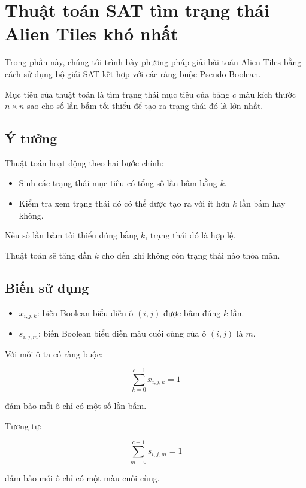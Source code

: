 \section{Thuật toán SAT tìm trạng thái Alien Tiles khó nhất}

Trong phần này, chúng tôi trình bày phương pháp giải bài toán
Alien Tiles bằng cách sử dụng bộ giải SAT kết hợp với các ràng buộc
Pseudo-Boolean.

Mục tiêu của thuật toán là tìm trạng thái mục tiêu của bảng
$c$ màu kích thước $n \times n$ sao cho số lần bấm tối thiểu
để tạo ra trạng thái đó là lớn nhất.

\subsection{Ý tưởng}

Thuật toán hoạt động theo hai bước chính:

\begin{itemize}
\item Sinh các trạng thái mục tiêu có tổng số lần bấm bằng $k$.
\item Kiểm tra xem trạng thái đó có thể được tạo ra với ít hơn $k$
lần bấm hay không.
\end{itemize}

Nếu số lần bấm tối thiểu đúng bằng $k$, trạng thái đó là hợp lệ.

Thuật toán sẽ tăng dần $k$ cho đến khi không còn trạng thái nào
thỏa mãn.

\subsection{Biến sử dụng}

\begin{itemize}
\item $x_{i,j,k}$: biến Boolean biểu diễn ô $(i,j)$ được bấm
đúng $k$ lần.
\item $s_{i,j,m}$: biến Boolean biểu diễn màu cuối cùng của ô
$(i,j)$ là $m$.
\end{itemize}

Với mỗi ô ta có ràng buộc:

\[
\sum_{k=0}^{c-1} x_{i,j,k} = 1
\]

đảm bảo mỗi ô chỉ có một số lần bấm.

Tương tự:

\[
\sum_{m=0}^{c-1} s_{i,j,m} = 1
\]

đảm bảo mỗi ô chỉ có một màu cuối cùng.


